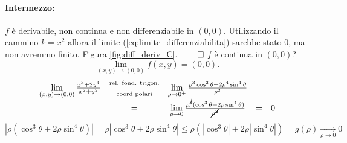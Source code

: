 \begin{example}
\begin{enumerate}
		\paragraph{Intermezzo:} $f$ è derivabile, non continua e non differenziabile in $(0,0)$. Utilizzando il cammino $k = x^2$ allora il limite (\ref{eq:limite_differenziabilita}) sarebbe stato 0, ma non avremmo finito. Figura \ref{fig:diff_deriv_C}. $\qed$
		$f$ è continua in $(0,0)$?
		\begin{equation*}
			\lim\limits_{(x,y)\rightarrow(0,0)}f(x,y)=(0,0).
		\end{equation*}
		\begin{equation*}
			\begin{matrix}
				\lim\limits_{(x,y)\rightarrow(0,0)} \frac{x^3 + 2y^4}{x^2 + y^2} &\overset{\text{rel. fond. trigon.}}{\underset{\text{coord polari}}{=}}&\lim\limits_{\rho \rightarrow 0^+}\frac{\rho^3 \cos^3 \theta + 2\rho^4\sin^4\theta}{\rho^2} &=&\\
				&=& \lim\limits_{\rho\rightarrow0}\frac{\rho^{\cancel{3}} (\cos^3\theta+2\rho\sin^4\theta)}{\cancel{\rho^2}} &=&0
			\end{matrix}
		\end{equation*}
		\begin{equation*}
			|\rho(\cos^3\theta + 2\rho\sin^4\theta)| = \rho |\cos^3\theta + 2 \rho \sin^4\theta| \leq \rho\left(|\cos^3\theta| + 2\rho|\sin^4\theta|\right) = g(\rho) \underset{\rho \rightarrow 0} {\rightarrow}0
		\end{equation*}
	\end{enumerate}
\end{example}

